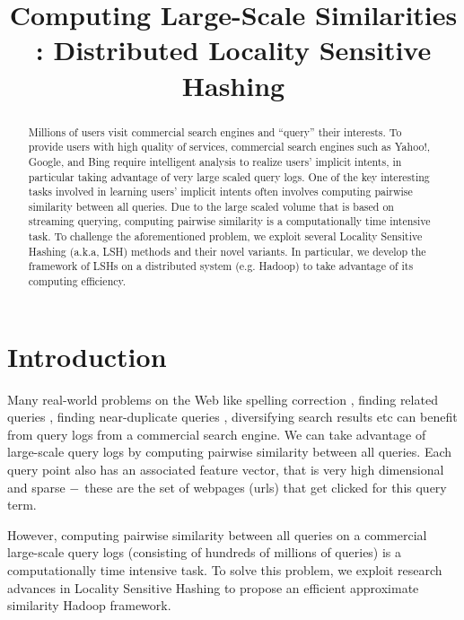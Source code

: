 \documentclass[11pt]{article}
\title{Computing Large-Scale Similarities : Distributed Locality Sensitive Hashing}
\begin{document}
\maketitle 

\begin{abstract}
Millions of users visit commercial search engines and  ``query'' their interests.
To provide users with high quality of services, 
commercial search engines such as Yahoo!, Google, and Bing require
intelligent analysis to realize users' implicit intents, in particular taking
advantage of very large scaled query logs.  One of the key
interesting tasks involved in learning users' implicit intents often involves 
computing pairwise similarity between all queries.
Due to the large scaled volume that is based on streaming querying, 
computing pairwise similarity is a computationally time intensive task. 
To challenge the aforementioned problem, we exploit  several
Locality Sensitive Hashing (a.k.a, LSH) methods and their novel variants. 
In particular, we develop the framework of LSHs on a distributed system (e.g. Hadoop) to take
advantage of its computing efficiency.




\end{abstract}


 \section{Introduction}
Many real-world problems on the Web like spelling correction \cite{}, 
finding related queries \cite{Jones06WWW,Jain11SIGIR,Song12WSDM}, finding near-duplicate queries \cite{}, 
diversifying search results \cite{Song11SIGIR} etc 
can benefit from query logs from a commercial search engine. 
We can take advantage of large-scale query logs 
by computing pairwise similarity between all queries. Each query point also has an associated feature vector, that is
very high dimensional and sparse $\--$ these are the set of webpages (urls) that
get clicked for this query term.

However, computing pairwise similarity between 
all queries on a commercial large-scale query logs (consisting of hundreds of millions of  queries) 
is a computationally time intensive task. 
To solve this problem, we exploit research advances in Locality Sensitive Hashing 
\cite{Indyk98STOC,Charikar02STOC,Andoni06FOCS,Andoni08CACM}  
to propose an efficient approximate similarity Hadoop framework.  
\end{document}
